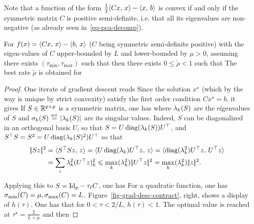 Note that a function of the form $\frac{1}{2} \langle Cx,\,x\rangle - \langle x,\,b\rangle$ is convex if and only if the symmetric matrix $C$ is positive semi-definite, i.e. that all its eigenvalues are non-negative (as already seen in~\eqref{eq-pca-decomp}).

\begin{prop}\label{prop-graddesc-quad}
	For $f(x)=\langle Cx,\,x\rangle-\langle b,\,x\rangle$ ($C$ being symmetric semi-definite positive) with the eigen-values of $C$ upper-bounded by $L$ and lower-bounded by $\mu>0$, assuming there exists $(\tau_{\min},\tau_{\max})$ such that
	then there exists $0 \leq \tilde\rho<1$ such that 
	The best rate $\tilde\rho$ is obtained for 
\end{prop}
\begin{proof}
	One iterate of gradient descent reads 
	Since the solution $x^\star$ (which by the way is unique by strict convexity) satisfy the first order condition $C x^\star=b$, it gives
	If $S \in \mathbb{R}^{p \times p}$ is a symmetric matrix, one has 
	where $\lambda_k(S)$ are the eigenvalues of $S$ and $\sigma_k(S) \stackrel{\mbox{\upshape\tiny def.}}{=} |\lambda_k(S)|$ are its singular values.
	Indeed, $S$ can be diagonalized in an orthogonal basis $U$, so that $S=U \operatorname{diag}(\lambda_k(S)) U^\top$,
	and $S^\top S = S^2 = U \operatorname{diag}(\lambda_k(S)^2) U^\top$ so that 
	\begin{align*}
		|\!| Sz |\!|^2 &= \langle S^\top S z,\,z\rangle = \langle U \operatorname{diag}(\lambda_k) U^\top z,\,z\rangle		 
		=\langle \operatorname{diag}(\lambda_k^2) U^\top z,\,U^\top z\rangle \\
		&= \sum_i \lambda_k^2 (U^\top z)_k^2 \leqslant \max_k(\lambda_k^2) |\!| U^\top z |\!|^2
		= \max_k(\lambda_k^2) |\!| z |\!|^2.
	\end{align*}
	
	Applying this to $S = \mathrm{Id}_p-\tau_\ell C$, one has
	For a quadratic function, one has $\sigma_{\min}(C) = \mu, \sigma_{\max}(C)=L$. Figure~\ref{fig-grad-desc-contract}, right, shows a display of $h(\tau)$. One has that for $0<\tau<2/L$, $h(\tau)<1$.
	The optimal value is reached at $\tau^\star = \frac{2}{L+\mu}$ and then 
\end{proof}



